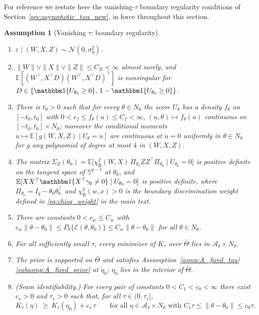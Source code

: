 \documentclass[11pt]{article}
\newtheorem{assumption}{Assumption}
\theoremstyle{definition}
\theoremstyle{plain}
\newcommand{\E}{\mathbb{E}}
\begin{document}
For reference we restate here the vanishing-$\tau$ boundary regularity conditions of Section~\ref{sec:asymptotic_tau_new}, in force throughout this section.

\begin{assumption}[Vanishing $\tau$: boundary regularity]
\label{asmp:V}
\leavevmode
\begin{enumerate}[label=(\roman*),nosep]
\item \label{subasmp:V_gauss} $\varepsilon\mid(W,X,Z)\sim\mathcal N(0,\sigma_0^2)$.
\item \label{subasmp:V_bounded} $\|W\|\vee\|X\|\vee\|Z\|\le C_B<\infty$ almost surely, and $\E[(W^\top,X^\top D)(W^\top,X^\top D)^\top]$ is nonsingular for $D\in\{\mathbbm 1\{U_{\theta_0}\ge0\},\,1-\mathbbm 1\{U_{\theta_0}\ge0\}\}$.
\item \label{subasmp:V_margin} There is $t_0>0$ such that for every $\theta\in N_0$ the score $U_\theta$ has a density $f_\theta$ on $[-t_0,t_0]$ with
$0<c_f\le f_\theta(u)\le C_f<\infty$, $(u,\theta)\mapsto f_\theta(u)$ continuous on $[-t_0,t_0]\times N_0$; moreover the conditional moments
$u\mapsto\E[g(W,X,Z)\mid U_\theta=u]$ are continuous at $u=0$ uniformly in $\theta\in N_0$ for $g$ any polynomial of degree at most $4$ in $(W,X,Z)$.
\item \label{subasmp:V_boundary_info} The matrix $\Sigma_Z(\theta_0)=\E\big[\chi^2_{\mathrm B}(W,X)\,\Pi_{\theta_0}ZZ^\top\Pi_{\theta_0}\mid U_{\theta_0}=0\big]$ is positive definite on the tangent space of $\mathbb S^{q-1}$ at $\theta_0$, and $\E[XX^\top\mathbbm 1\{X^\top\gamma_0\neq0\}\mid U_{\theta_0}=0]$ is positive definite, where $\Pi_{\theta_0}=I_q-\theta_0\theta_0^\top$ and $\chi^2_{\mathrm B}(w,x)>0$ is the boundary discrimination weight defined in \eqref{eq:chisq_weight} in the main text.
\item \label{subasmp:V_wedge} There are constants $0<c_w\le C_w$ with
$c_w\|\theta-\theta_0\|\le P_0\{\mathcal E(\theta,\theta_0)\}\le C_w\|\theta-\theta_0\|$ for all $\theta\in N_0$.
\item \label{subasmp:V_anchor} For all sufficiently small $\tau$, every minimizer of $K_\tau$ over $\bar\Theta$ lies in $\mathcal A_\delta\times N_0$.
\item \label{subasmp:V_prior} The prior is supported on $\bar\Theta$ and satisfies Assumption~\ref{asmp:A_fixed_tau}\ref{subasmp:A_fixed_prior} at $\tilde\eta_0$; $\eta_0$ lies in the interior of $\bar\Theta$.
\item \label{subasmp:V_seam} (Seam identifiability.) For every pair of constants $0<C_1<c_0<\infty$ there exist $c_s>0$ and $\tau_s>0$ such that, for all $\tau\in(0,\tau_s]$,
\[
K_\tau(\eta)\ \ge\ K_\tau(\eta_0)+c_s\,\tau
\qquad\text{for all }\eta\in\mathcal A_\delta\times N_0\text{ with }C_1\tau\le\|\theta-\theta_0\|\le c_0\tau .
\]
\end{enumerate}
\end{assumption}
\end{document}
